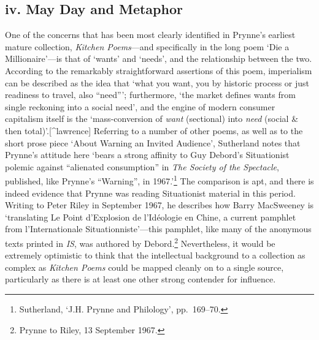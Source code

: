 \documentclass[]{article}
\begin{document}
\subsection{iv. May Day and Metaphor}\label{iv.-may-day-and-metaphor}

One of the concerns that has been most clearly identified in Prynne’s
earliest mature collection, \emph{Kitchen Poems}—and specifically in the
long poem ‘Die a Millionaire’—is that of ‘wants’ and ‘needs’, and the
relationship between the two. According to the remarkably
straightforward assertions of this poem, imperialism can be described as
the idea that ‘what you want, you by \textbar{} historic process or just
readiness \textbar{} to travel, also “need”’; furthermore, ‘the market
defines wants from \textbar{} single reckoning into a social need’, and
the engine of modern consumer capitalism itself is the ‘mass-conversion
of \emph{want} (sectional) into \textbar{} \emph{need} (social \& then
total)’.{[}\^{}lawrence{]} Referring to a number of other poems, as well
as to the short prose piece ‘About Warning an Invited Audience’,
Sutherland notes that Prynne’s attitude here ‘bears a strong affinity to
Guy Debord’s Situationist polemic against “alienated consumption” in
\emph{The Society of the Spectacle}, published, like Prynne’s “Warning”,
in 1967.’\footnote{Sutherland, ‘J.H. Prynne and Philology’, pp.~169–70.}
The comparison is apt, and there is indeed evidence that Prynne was
reading Situationist material in this period. Writing to Peter Riley in
September 1967, he describes how Barry MacSweeney is ‘translating Le
Point d’Explosion de l’Idéologie en Chine, a current pamphlet from
l’Internationale Situationniste’—this pamphlet, like many of the
anonymous texts printed in \emph{IS}, was authored by Debord.\footnote{Prynne
  to Riley, 13 September 1967.} Nevertheless, it would be extremely
optimistic to think that the intellectual background to a collection as
complex as \emph{Kitchen Poems} could be mapped cleanly on to a single
source, particularly as there is at least one other strong contender for
influence.
\end{document}

